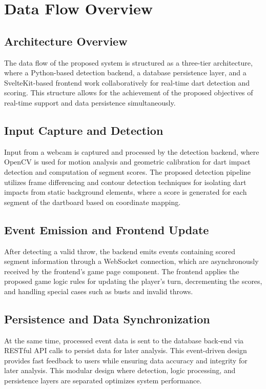 \setauthor{\firstauthor}

\section{Data Flow Overview}

\subsection{Architecture Overview}
The data flow of the proposed system is structured as a three-tier architecture, where a Python-based detection backend, a database persistence layer, and a SvelteKit-based frontend work collaboratively for real-time dart detection and scoring. This structure allows for the achievement of the proposed objectives of real-time support and data persistence simultaneously. 

\subsection{Input Capture and Detection}
Input from a webcam is captured and processed by the detection backend, where OpenCV is used for motion analysis and geometric calibration for dart impact detection and computation of segment scores. The proposed detection pipeline utilizes frame differencing and contour detection techniques for isolating dart impacts from static background elements, where a score is generated for each segment of the dartboard based on coordinate mapping. 

\subsection{Event Emission and Frontend Update}
After detecting a valid throw, the backend emits events containing scored segment information through a WebSocket connection, which are asynchronously received by the frontend's game page component. The frontend applies the proposed game logic rules for updating the player's turn, decrementing the scores, and handling special cases such as busts and invalid throws. 

\subsection{Persistence and Data Synchronization}
At the same time, processed event data is sent to the database back-end via RESTful API calls to persist data for later analysis. This event-driven design provides fast feedback to users while ensuring data accuracy and integrity for later analysis. This modular design where detection, logic processing, and persistence layers are separated optimizes system performance.

